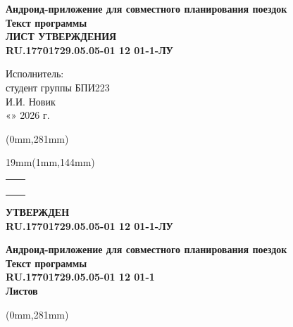 \documentclass[12pt,a4paper]{article}
\newcommand{\doccode}{RU.17701729.05.05-01 12 01-1}
\newcommand{\doccodeapproval}{RU.17701729.05.05-01 12 01-1-ЛУ}
\newcommand{\doctitle}{Андроид-приложение для совместного планирования поездок}
\newcommand{\doctype}{Текст программы}
\newcommand{\leftapprovalstamp}[1]{%
  \begingroup
  \renewcommand{\arraystretch}{1.0}
  \setlength{\tabcolsep}{0pt}
  \footnotesize
  \begin{tabular}{|>{\centering\arraybackslash}m{0.65cm}|>{\centering\arraybackslash}m{1.05cm}|}
    \hline
    \rotatebox{90}{Подп. и дата} & \rule{0pt}{1.10cm}\\
    \hline
    \rotatebox{90}{Инв. № дубл.} & \rule{0pt}{1.00cm}\\
    \hline
    \rotatebox{90}{Взам. инв. №} & \rule{0pt}{1.00cm}\\
    \hline
    \rotatebox{90}{Подп. и дата} & \rule{0pt}{1.10cm}\\
    \hline
    \rotatebox{90}{Инв. № подл.} &
    \rotatebox{90}{\scalebox{0.70}{#1}}\rule{0pt}{0.95cm}\\
    \hline
  \end{tabular}
  \endgroup
}
\newcommand{\placestamp}[2]{%
  \begin{textblock*}{19mm}(1mm,#2)
    \leftapprovalstamp{#1}
  \end{textblock*}
}
\begin{document}
\vspace{0.75cm}
\begin{center}
  {\large\textbf{\doctitle}}\\[0.22cm]
  {\large\textbf{\doctype}}\\[0.18cm]
  {\large\textbf{ЛИСТ УТВЕРЖДЕНИЯ}}\\[0.18cm]
  {\large\textbf{\doccodeapproval}}
\end{center}

\vspace{1.15cm}
\begin{flushright}
  Исполнитель:\\[0.25cm]
  студент группы БПИ223\\[0.35cm]
  \underline{\hspace{2.5cm}} И.И. Новик\\[0.25cm]
  «\underline{\hspace{0.9cm}}» \underline{\hspace{2.8cm}} 2026 г.
\end{flushright}

\begin{textblock*}{\paperwidth}(0mm,281mm)
\end{textblock*}
\newpage

\thispagestyle{empty}
\placestamp{\doccodeapproval}{144mm}
\vspace*{-0.6cm}

\begin{flushleft}
  \textbf{УТВЕРЖДЕН}\\[0.2cm]
  \textbf{\doccodeapproval}
\end{flushleft}

\vspace{1.4cm}
\begin{center}
  {\large\textbf{\doctitle}}\\[0.22cm]
  {\Large\textbf{\doctype}}\\[0.22cm]
  {\Large\textbf{\doccode}}\\[0.2cm]
  {\Large\textbf{Листов \pageref{lastnumberedpage}}}
\end{center}

\begin{textblock*}{\paperwidth}(0mm,281mm)
\end{textblock*}

\clearpage
\hypersetup{pageanchor=true}
\setcounter{page}{2}
\pagestyle{tpstyle}
\tableofcontents
\clearpage
\end{document}
